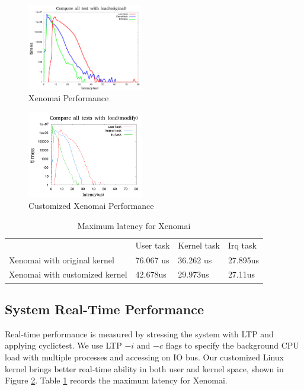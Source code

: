 \documentclass[conference]{IEEEtran}
\begin{document}
\begin{figure}	
	\centering
	\includegraphics[width=2in]{img/xenomai_load.png}
	\caption{Xenomai Performance}
	\label{fig:xeno_perf}
\end{figure}

\begin{figure}
	\centering
	\includegraphics[width=2in]{img/xenomai_load_modify.png}
	\caption{Customized Xenomai Performance}
	\label{fig:xeno_perf_modify}
\end{figure}

\begin{table}[]
\centering
\caption{Maximum latency for Xenomai}
\label{xeno_compare}
\begin{tabular}{llll}
                              & User task & Kernel task & Irq task \\
Xenomai with original kernel  & 76.067 us & 36.262 us   & 27.895us \\
Xenomai with customized kernel & 42.678us  & 29.973us    & 27.11us 
\end{tabular}
\end{table}

\subsection{System Real-Time Performance}

Real-time performance is measured by stressing the system with LTP and applying cyclictest. We use LTP $-i$ and $-c$ flags to specify the background CPU load with multiple processes and accessing on IO bus. Our customized Linux kernel brings better real-time ability in both user and kernel space, shown in Figure \ref{fig:xeno_perf_modify}. Table \ref{xeno_compare} records the maximum latency for Xenomai.
\end{document}
